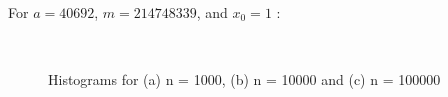 \documentclass[11pt]{article}
\begin{document}
For $a = 40692$, $m = 214748339$, and $x_{0} = 1$ :
\begin{figure}[H]
  \centering
  \hspace{10mm}
  \\
    \caption{Histograms for (a) n = 1000, (b) n = 10000 and (c) n = 100000}
\end{figure}
\end{document}
